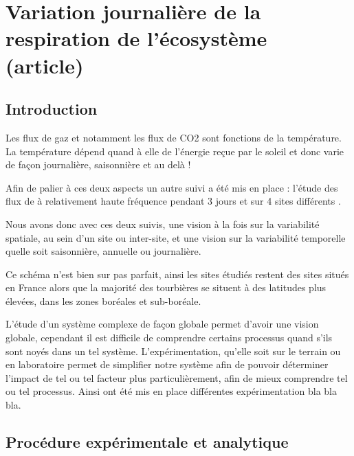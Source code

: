 \chapter{Variation journalière de la respiration de l'écosystème (article)}

\minitoc

\newpage

\section{Introduction}
Les flux de gaz et notamment les flux de CO2 sont fonctions de la température.
La température dépend quand à elle de l'énergie reçue par le soleil et donc varie de façon journalière, saisonnière et au delà !

Afin de palier à ces deux aspects un autre suivi a été mis en place : l'étude des flux de \coo à relativement haute fréquence  pendant 3 jours et sur 4 sites différents .

Nous avons donc avec ces deux suivis, une vision à la fois sur la variabilité spatiale, au sein d'un site ou inter-site, et une vision sur la variabilité temporelle quelle soit saisonnière, annuelle ou journalière.

Ce schéma n'est bien sur pas parfait, ainsi les sites étudiés restent des sites situés en France alors que la majorité des tourbières se situent à des latitudes plus élevées, dans les zones boréales et sub-boréale.


L'étude d'un système complexe de façon globale permet d'avoir une vision globale, cependant il est difficile de comprendre certains processus quand s'ils sont noyés dans un tel système. 
L'expérimentation, qu'elle soit sur le terrain ou en laboratoire permet de simplifier notre système afin de pouvoir déterminer l'impact de tel ou tel facteur plus particulièrement, afin de mieux comprendre tel ou tel processus.
Ainsi ont été mis en place différentes expérimentation bla bla bla.

\section{Procédure expérimentale et analytique}

